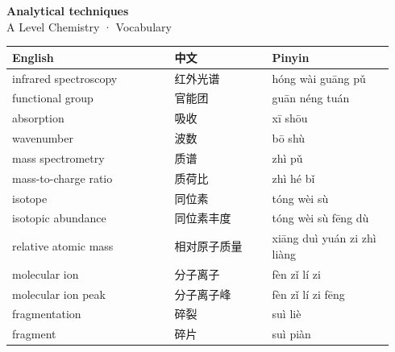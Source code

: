 \documentclass[11pt]{article}
\begin{document}
\begin{center}
  {\LARGE\bfseries Analytical techniques}\\[0.35em]
  {\large A Level Chemistry · Vocabulary}
\end{center}
\vspace{0.6em}

\begin{longtable}{@{}p{0.40\linewidth}p{0.24\linewidth}p{0.30\linewidth}@{}}
\toprule
\textbf{English} & \textbf{中文} & \textbf{Pinyin} \\
\midrule
\endhead
\bottomrule
\endlastfoot
infrared spectroscopy & 红外光谱 & hóng wài guāng pǔ \\
functional group & 官能团 & guān néng tuán \\
absorption & 吸收 & xī shōu \\
wavenumber & 波数 & bō shù \\
mass spectrometry & 质谱 & zhì pǔ \\
mass-to-charge ratio & 质荷比 & zhì hé bǐ \\
isotope & 同位素 & tóng wèi sù \\
isotopic abundance & 同位素丰度 & tóng wèi sù fēng dù \\
relative atomic mass & 相对原子质量 & xiāng duì yuán zi zhì liàng \\
molecular ion & 分子离子 & fèn zǐ lí zi \\
molecular ion peak & 分子离子峰 & fèn zǐ lí zi fēng \\
fragmentation & 碎裂 & suì liè \\
fragment & 碎片 & suì piàn \\
\end{longtable}
\end{document}
